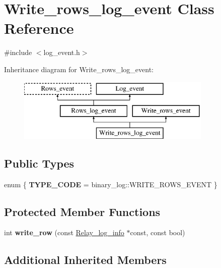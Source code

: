 \hypertarget{classWrite__rows__log__event}{}\section{Write\+\_\+rows\+\_\+log\+\_\+event Class Reference}
\label{classWrite__rows__log__event}


{\ttfamily \#include $<$log\+\_\+event.\+h$>$}

Inheritance diagram for Write\+\_\+rows\+\_\+log\+\_\+event\+:\begin{figure}[H]
\begin{center}
\leavevmode
\includegraphics[height=3.000000cm]{classWrite__rows__log__event}
\end{center}
\end{figure}
\subsection*{Public Types}
\begin{DoxyCompactItemize}
\item 
\mbox{\label{classWrite__rows__log__event_a6fc02694d8616411cd0669d9f8a38b40}} 
enum \{ {\bfseries T\+Y\+P\+E\+\_\+\+C\+O\+DE} = binary\+\_\+log\+:\+:W\+R\+I\+T\+E\+\_\+\+R\+O\+W\+S\+\_\+\+E\+V\+E\+NT
 \}
\end{DoxyCompactItemize}
\subsection*{Protected Member Functions}
\begin{DoxyCompactItemize}
\item 
\mbox{\label{classWrite__rows__log__event_ab1ecb6b8c2d774ac100cd3305f1b9dd8}} 
int {\bfseries write\+\_\+row} (const \mbox{\hyperlink{classRelay__log__info}{Relay\+\_\+log\+\_\+info}} $\ast$const, const bool)
\end{DoxyCompactItemize}
\subsection*{Additional Inherited Members}


